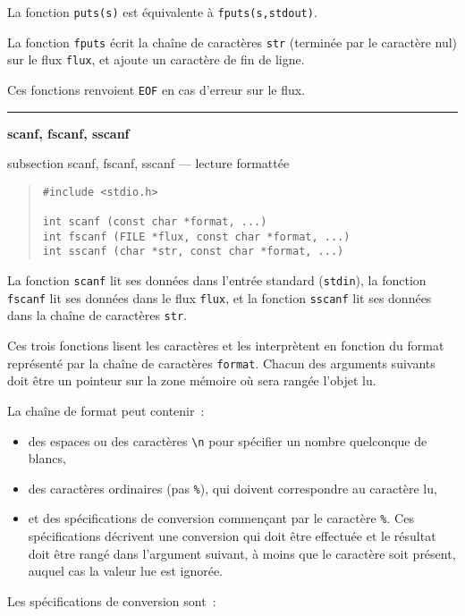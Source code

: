 \documentclass [twoside] {report}
\newcommand {\primitive} [1]
    {
	\phantomsection
	{\large \bf #1}
	\addcontentsline {toc} {subsection} {#1}
    }
\newcommand {\separation}
    {
	\vspace {5mm}
	\nopagebreak
	\hrule
    }
\begin{document}
La fonction {\tt puts(s)} est équivalente à {\tt fputs(s,stdout)}.

La fonction {\tt fputs} écrit la chaîne de caractères {\tt str}
(terminée par le caractère nul) sur le flux {\tt flux},
et ajoute un caractère de fin de ligne.

Ces fonctions renvoient {\tt EOF} en cas d'erreur sur le flux.


\separation
\primitive {scanf, fscanf, sscanf} --- lecture formattée

\begin {quote}
\begin {verbatim}
#include <stdio.h>

int scanf (const char *format, ...)
int fscanf (FILE *flux, const char *format, ...)
int sscanf (char *str, const char *format, ...)
\end{verbatim}
\end {quote}

La fonction {\tt scanf} lit ses données dans l'entrée
standard ({\tt stdin}), la fonction {\tt fscanf} lit ses données
dans le flux {\tt flux}, et la fonction {\tt sscanf} lit ses
données dans la chaîne de caractères {\tt str}.

Ces trois fonctions lisent les caractères et les interprètent en
fonction du format représenté par la chaîne de caractères {\tt format}.
Chacun des arguments suivants doit être un pointeur sur la zone mémoire
où sera rangée l'objet lu.

La chaîne de format peut contenir~:

\begin {itemize}
    \item des espaces ou des caractères \verb:\n: pour spécifier un
	nombre quelconque de blancs, \par
    \item des caractères ordinaires (pas {\tt \%}), qui doivent
	correspondre au caractère lu, \par
    \item et des spécifications de conversion commençant par le
	caractère {\tt \%}. Ces spécifications décrivent une conversion
	qui doit être effectuée et le résultat doit être rangé dans
	l'argument suivant, à moins que le caractère {\tt *} soit
	présent, auquel cas la valeur lue est ignorée.
\end {itemize}

Les spécifications de conversion sont~:
\end{document}
